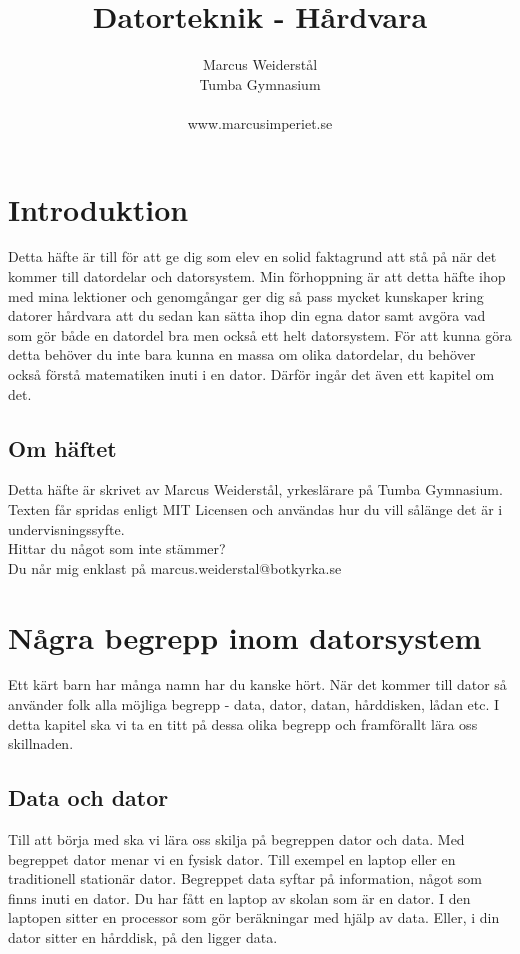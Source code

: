 \documentclass[12pt, letterpaper]{report}
\title{Datorteknik - Hårdvara}
\author{Marcus Weiderstål \\ Tumba Gymnasium \\ \\ www.marcusimperiet.se}
\date{}
\begin{document}
\begin{titlepage}
\maketitle
\end{titlepage}

\tableofcontents{}
\chapter{Introduktion}
Detta häfte är till för att ge dig som elev en solid faktagrund att stå på när det kommer till datordelar och datorsystem. Min förhoppning är att detta häfte ihop med mina lektioner och genomgångar ger dig så pass mycket kunskaper kring datorer hårdvara att du sedan kan sätta ihop din egna dator samt avgöra vad som gör både en datordel bra men också ett helt datorsystem. För att kunna göra detta behöver du inte bara kunna en massa om olika datordelar, du behöver också förstå matematiken inuti i en dator. Därför ingår det även ett kapitel om det.

\section{Om häftet}
Detta häfte är skrivet av Marcus Weiderstål, yrkeslärare på Tumba Gymnasium. Texten får spridas enligt MIT Licensen och användas hur du vill sålänge det är i undervisningssyfte.\\Hittar du något som inte stämmer?\\ Du når mig enklast på  marcus.weiderstal@botkyrka.se
\newpage 

\chapter{Några begrepp inom datorsystem}
Ett kärt barn har många namn har du kanske hört. När det kommer till dator så använder folk alla möjliga begrepp - data, dator, datan, hårddisken, lådan etc. I detta kapitel ska vi ta en titt på dessa olika begrepp och framförallt lära oss skillnaden.

\section{Data och dator}
Till att börja med ska vi lära oss skilja på begreppen dator och data. Med begreppet dator menar vi en fysisk dator. Till exempel en laptop eller en traditionell stationär dator. Begreppet data syftar på information, något som finns inuti en dator. Du har fått en laptop av skolan som är en dator. I den laptopen sitter en processor som gör beräkningar med hjälp av data. Eller, i din dator sitter en hårddisk, på den ligger data. 
\end{document}
